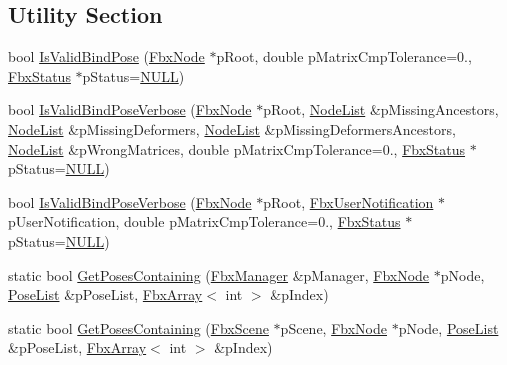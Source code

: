 \subsection*{Utility Section}
\begin{DoxyCompactItemize}
\item 
bool \hyperlink{class_fbx_pose_ac5e304f440e64f4152aac437ab8fbddc}{Is\+Valid\+Bind\+Pose} (\hyperlink{class_fbx_node}{Fbx\+Node} $\ast$p\+Root, double p\+Matrix\+Cmp\+Tolerance=0., \hyperlink{class_fbx_status}{Fbx\+Status} $\ast$p\+Status=\hyperlink{fbxarch_8h_a070d2ce7b6bb7e5c05602aa8c308d0c4}{N\+U\+LL})
\item 
bool \hyperlink{class_fbx_pose_a75a0cfacdcebe5d078ede0aa6cadf389}{Is\+Valid\+Bind\+Pose\+Verbose} (\hyperlink{class_fbx_node}{Fbx\+Node} $\ast$p\+Root, \hyperlink{fbxpose_8h_ad178cb63baf67bfc63da02aafae3a175}{Node\+List} \&p\+Missing\+Ancestors, \hyperlink{fbxpose_8h_ad178cb63baf67bfc63da02aafae3a175}{Node\+List} \&p\+Missing\+Deformers, \hyperlink{fbxpose_8h_ad178cb63baf67bfc63da02aafae3a175}{Node\+List} \&p\+Missing\+Deformers\+Ancestors, \hyperlink{fbxpose_8h_ad178cb63baf67bfc63da02aafae3a175}{Node\+List} \&p\+Wrong\+Matrices, double p\+Matrix\+Cmp\+Tolerance=0., \hyperlink{class_fbx_status}{Fbx\+Status} $\ast$p\+Status=\hyperlink{fbxarch_8h_a070d2ce7b6bb7e5c05602aa8c308d0c4}{N\+U\+LL})
\item 
bool \hyperlink{class_fbx_pose_abbbc7ba0cedb2c1eaccc7c44a6070901}{Is\+Valid\+Bind\+Pose\+Verbose} (\hyperlink{class_fbx_node}{Fbx\+Node} $\ast$p\+Root, \hyperlink{class_fbx_user_notification}{Fbx\+User\+Notification} $\ast$p\+User\+Notification, double p\+Matrix\+Cmp\+Tolerance=0., \hyperlink{class_fbx_status}{Fbx\+Status} $\ast$p\+Status=\hyperlink{fbxarch_8h_a070d2ce7b6bb7e5c05602aa8c308d0c4}{N\+U\+LL})
\item 
static bool \hyperlink{class_fbx_pose_a7a312148d8ba4b20243b20152d809b3f}{Get\+Poses\+Containing} (\hyperlink{class_fbx_manager}{Fbx\+Manager} \&p\+Manager, \hyperlink{class_fbx_node}{Fbx\+Node} $\ast$p\+Node, \hyperlink{fbxpose_8h_ad68863a9c2ab60c2210bb3dff02a680a}{Pose\+List} \&p\+Pose\+List, \hyperlink{class_fbx_array}{Fbx\+Array}$<$ int $>$ \&p\+Index)
\item 
static bool \hyperlink{class_fbx_pose_a8d203f54db3a2903d98500b2b66aa4e4}{Get\+Poses\+Containing} (\hyperlink{class_fbx_scene}{Fbx\+Scene} $\ast$p\+Scene, \hyperlink{class_fbx_node}{Fbx\+Node} $\ast$p\+Node, \hyperlink{fbxpose_8h_ad68863a9c2ab60c2210bb3dff02a680a}{Pose\+List} \&p\+Pose\+List, \hyperlink{class_fbx_array}{Fbx\+Array}$<$ int $>$ \&p\+Index)

\end{DoxyCompactItemize}
